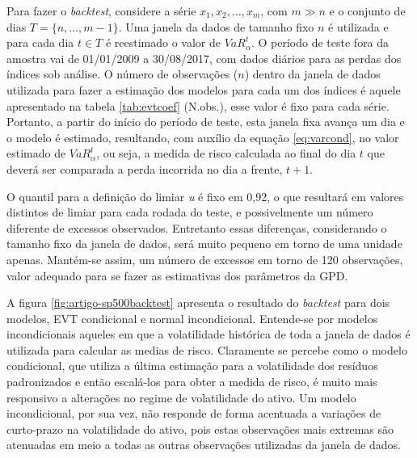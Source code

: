 \documentclass[1p]{elsarticle}
\theoremstyle{definition}
\begin{document}
Para fazer o \emph{backtest}, considere a série $x_1, x_2, \ldots, x_m$, com $m\gg n$ e o conjunto de dias $T = \{n, \ldots, m-1\}$. Uma janela da dados de tamanho fixo $n$ é utilizada e para cada dia $t \in T$ é reestimado o valor de $VaR^t_\alpha$. O período de teste fora da amostra vai de 01/01/2009 a 30/08/2017, com dados diários para as perdas dos índices sob análise. O número de observações ($n$) dentro da janela de dados utilizada para fazer a estimação dos modelos para cada um dos índices é aquele apresentado na tabela \ref{tab:evtcoef} (N.obs.), esse valor é fixo para cada série. Portanto, a partir do início do período de teste, esta janela fixa avança um dia e o modelo é estimado, resultando, com auxílio da equação \eqref{eq:varcond}, no valor estimado de $VaR_\alpha^t$, ou seja, a medida de risco calculada ao final do dia $t$ que deverá ser comparada a perda incorrida no dia a frente, $t+1$.

O quantil para a definição do limiar \emph{u} é fixo em 0,92, o que resultará em valores distintos de limiar para cada rodada do teste, e possivelmente um número diferente de excessos observados. Entretanto essas diferenças, considerando o tamanho fixo da janela de dados, será muito pequeno em torno de uma unidade apenas. Mantém-se assim, um número de excessos em torno de 120 observações, valor adequado para se fazer as estimativas dos parâmetros da GPD.

A figura \ref{fig:artigo-sp500backtest} apresenta o resultado do \emph{backtest} para dois modelos, EVT condicional e normal incondicional. Entende-se por modelos incondicionais aqueles em que a volatilidade histórica de toda a janela de dados é utilizada para calcular as medias de risco. Claramente se percebe como o modelo condicional, que utiliza a última estimação para a volatilidade dos resíduos padronizados e então escalá-los para obter a medida de risco, é muito mais responsivo a alterações no regime de volatilidade do ativo. Um modelo incondicional, por sua vez, não responde de forma acentuada a variações de curto-prazo na volatilidade do ativo, pois estas observações mais extremas são atenuadas em meio a todas as outras observações utilizadas da janela de dados.
\end{document}
